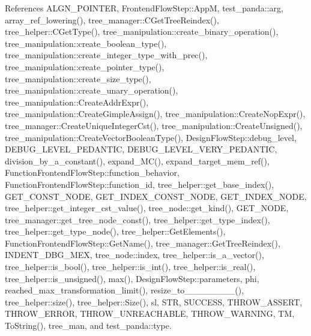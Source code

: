 References A\+L\+G\+N\+\_\+\+P\+O\+I\+N\+T\+ER, Frontend\+Flow\+Step\+::\+AppM, test\+\_\+panda\+::arg, array\+\_\+ref\+\_\+lowering(), tree\+\_\+manager\+::\+C\+Get\+Tree\+Reindex(), tree\+\_\+helper\+::\+C\+Get\+Type(), tree\+\_\+manipulation\+::create\+\_\+binary\+\_\+operation(), tree\+\_\+manipulation\+::create\+\_\+boolean\+\_\+type(), tree\+\_\+manipulation\+::create\+\_\+integer\+\_\+type\+\_\+with\+\_\+prec(), tree\+\_\+manipulation\+::create\+\_\+pointer\+\_\+type(), tree\+\_\+manipulation\+::create\+\_\+size\+\_\+type(), tree\+\_\+manipulation\+::create\+\_\+unary\+\_\+operation(), tree\+\_\+manipulation\+::\+Create\+Addr\+Expr(), tree\+\_\+manipulation\+::\+Create\+Gimple\+Assign(), tree\+\_\+manipulation\+::\+Create\+Nop\+Expr(), tree\+\_\+manager\+::\+Create\+Unique\+Integer\+Cst(), tree\+\_\+manipulation\+::\+Create\+Unsigned(), tree\+\_\+manipulation\+::\+Create\+Vector\+Boolean\+Type(), Design\+Flow\+Step\+::debug\+\_\+level, D\+E\+B\+U\+G\+\_\+\+L\+E\+V\+E\+L\+\_\+\+P\+E\+D\+A\+N\+T\+IC, D\+E\+B\+U\+G\+\_\+\+L\+E\+V\+E\+L\+\_\+\+V\+E\+R\+Y\+\_\+\+P\+E\+D\+A\+N\+T\+IC, division\+\_\+by\+\_\+a\+\_\+constant(), expand\+\_\+\+M\+C(), expand\+\_\+target\+\_\+mem\+\_\+ref(), Function\+Frontend\+Flow\+Step\+::function\+\_\+behavior, Function\+Frontend\+Flow\+Step\+::function\+\_\+id, tree\+\_\+helper\+::get\+\_\+base\+\_\+index(), G\+E\+T\+\_\+\+C\+O\+N\+S\+T\+\_\+\+N\+O\+DE, G\+E\+T\+\_\+\+I\+N\+D\+E\+X\+\_\+\+C\+O\+N\+S\+T\+\_\+\+N\+O\+DE, G\+E\+T\+\_\+\+I\+N\+D\+E\+X\+\_\+\+N\+O\+DE, tree\+\_\+helper\+::get\+\_\+integer\+\_\+cst\+\_\+value(), tree\+\_\+node\+::get\+\_\+kind(), G\+E\+T\+\_\+\+N\+O\+DE, tree\+\_\+manager\+::get\+\_\+tree\+\_\+node\+\_\+const(), tree\+\_\+helper\+::get\+\_\+type\+\_\+index(), tree\+\_\+helper\+::get\+\_\+type\+\_\+node(), tree\+\_\+helper\+::\+Get\+Elements(), Function\+Frontend\+Flow\+Step\+::\+Get\+Name(), tree\+\_\+manager\+::\+Get\+Tree\+Reindex(), I\+N\+D\+E\+N\+T\+\_\+\+D\+B\+G\+\_\+\+M\+EX, tree\+\_\+node\+::index, tree\+\_\+helper\+::is\+\_\+a\+\_\+vector(), tree\+\_\+helper\+::is\+\_\+bool(), tree\+\_\+helper\+::is\+\_\+int(), tree\+\_\+helper\+::is\+\_\+real(), tree\+\_\+helper\+::is\+\_\+unsigned(), max(), Design\+Flow\+Step\+::parameters, phi, reached\+\_\+max\+\_\+transformation\+\_\+limit(), resize\+\_\+to\+\_\+\_\+\_\+\_\+\_\+\_\+\_\+\_(), tree\+\_\+helper\+::size(), tree\+\_\+helper\+::\+Size(), sl, S\+TR, S\+U\+C\+C\+E\+SS, T\+H\+R\+O\+W\+\_\+\+A\+S\+S\+E\+RT, T\+H\+R\+O\+W\+\_\+\+E\+R\+R\+OR, T\+H\+R\+O\+W\+\_\+\+U\+N\+R\+E\+A\+C\+H\+A\+B\+LE, T\+H\+R\+O\+W\+\_\+\+W\+A\+R\+N\+I\+NG, TM, To\+String(), tree\+\_\+man, and test\+\_\+panda\+::type.

